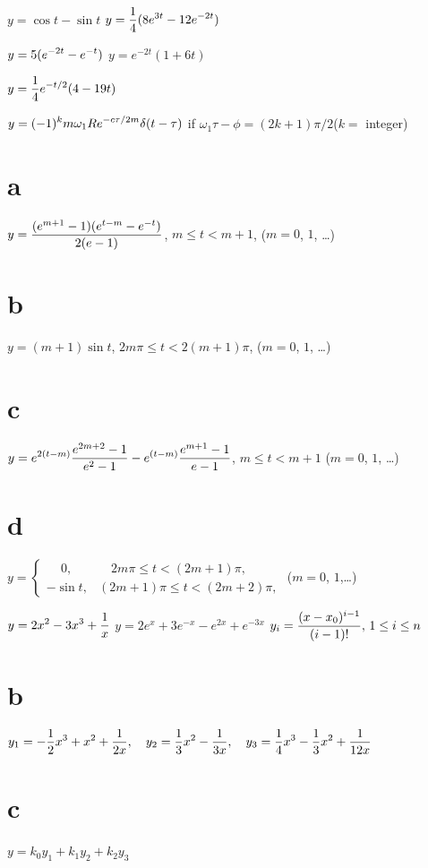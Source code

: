 $y=\cos t-\sin t$ \quad
{}
$\displaystyle{y=\frac{1}{4}(8e^{3t}-12e^{-2t})}$

$\displaystyle{y=5(e^{-2t}-e^{-t})}$ \quad
{}
$y=e^{-2t}(1+6t)$

$\displaystyle{y=\frac{1}{4}e^{-t/2}(4-19t)}$

$\displaystyle{y=(-1)^{k}m\omega_{1}Re^{-c\tau/2m}\delta(t-\tau)}$
if $\omega_{1}\tau-\phi=(2k+1)\pi/2$\nolinebreak ($k=$
integer)

\part{a} $\displaystyle{y=\frac{(e^{m+1}-1)(e^{t-m}-e^{-t})}{2(e-1)}}$, \quad
$m\le t<m+1$, ($m=0$, $1$, \dots)
 \part{b}
$y=(m+1)\sin t$,\;    $2m\pi\le t<2(m+1)\pi$,\;   ($m=0$, $1$, \dots)
 \part{c}
$\displaystyle{y=e^{2(t-m)}\frac{e^{2m+2}-1}{e^{2}-1}-e^{(t-m)}\frac{e^{m+1}-1}{e-1}}$,\;
$m\le t<m+1$\;
($m=0$, $1$, \dots)
 \part{d}
$y=
\begin{cases}
\quad\, 0,&\quad 2m\pi\le t<(2m+1)\pi,\\
-\sin t,& (2m+1)\pi\le t <(2m+2)\pi,
\end{cases}$ \quad ($m=0$, $1$,\dots)


$y=\displaystyle{2x^2-3x^3+\frac{1}{x}}$\;
$y=2e^x+3e^{-x}-e^{2x}+e^{-3x}$\;
$\displaystyle{y_i=\frac{(x-x_0)^{i-1}}{(i-1)!},\,1\le i
\le n}$

\part{b}
$\displaystyle{ y_1=-\frac{1}{2}x^3+x^2+\frac{1}{2x},
\quad y_2=\frac{1}{3}x^2-\frac{1}{3x},\quad y_3=\frac{1}{4} x^3-\frac{1}{3}x^2+\frac{1}{12x}}$
\part{c} $y=k_0y_1+k_1y_2+k_2 y_3$

